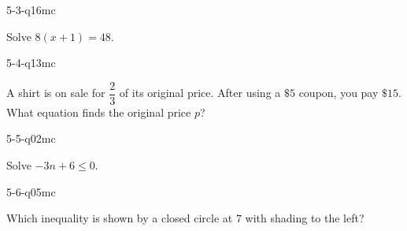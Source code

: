 \begin{practiceQuestion}{5-3-q16}{mc}
\begin{questionText}
Solve $8(x + 1) = 48$.
\end{questionText}
\end{practiceQuestion}

\begin{practiceQuestion}{5-4-q13}{mc}
\begin{questionText}
A shirt is on sale for $\dfrac{2}{3}$ of its original price. After using a $\$5$ coupon, you pay $\$15$. What equation finds the original price $p$?
\end{questionText}
\end{practiceQuestion}

\begin{practiceQuestion}{5-5-q02}{mc}
\begin{questionText}
Solve $-3n + 6 \leq 0$.
\end{questionText}
\end{practiceQuestion}

\begin{practiceQuestion}{5-6-q05}{mc}
\begin{questionText}
Which inequality is shown by a closed circle at $7$ with shading to the left?
\end{questionText}
\end{practiceQuestion}

